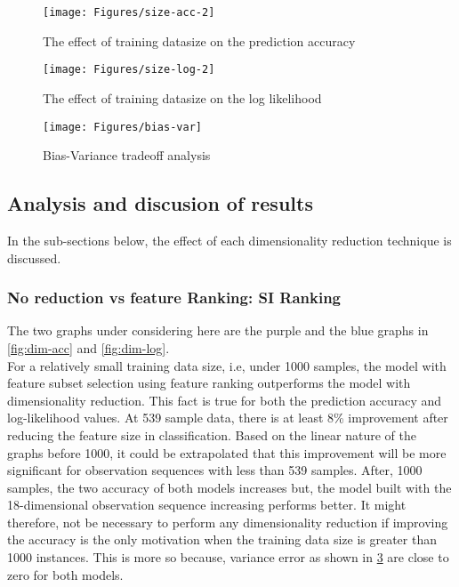 \begin{figure}[ht!]
	\texttt{[image: Figures/size-acc-2]}
	\caption{The effect of training datasize on the prediction accuracy}
	\label{fig:size-acc}
\end{figure}

\begin{figure}[ht!]
	\texttt{[image: Figures/size-log-2]}
	\caption{The effect of training datasize on the log likelihood}
	\label{fig:size-log}
\end{figure}

\begin{figure}[ht!]
	\centering
	\texttt{[image: Figures/bias-var]}
	\caption{Bias-Variance tradeoff analysis}
	\label{fig:bias-var}
\end{figure}

\subsection{Analysis and discusion of results}
In the sub-sections below, the effect of each dimensionality reduction technique is discussed.
 
\subsubsection{No reduction vs feature Ranking: SI Ranking}
The two graphs under considering here are the purple and the blue graphs in \ref{fig:dim-acc} and \ref{fig:dim-log}. \\
For a relatively small training data size, i.e, under 1000 samples, the model with feature subset selection using feature ranking outperforms the model with dimensionality reduction. This fact is true for both the prediction accuracy and log-likelihood values. At 539 sample data, there is at least 8\% improvement after reducing the feature size in classification. Based on the linear nature of the graphs before 1000, it could be extrapolated that this improvement will be more significant for observation sequences with less than 539 samples.
After, 1000 samples, the two accuracy of both models increases but, the model built with the 18-dimensional observation sequence increasing performs better.
It might therefore, not be necessary to perform any dimensionality reduction if improving the accuracy is the only motivation when the training data size is greater than 1000 instances. This is more so because, variance error as shown in \ref{fig:bias-var} are close to zero for both models.

